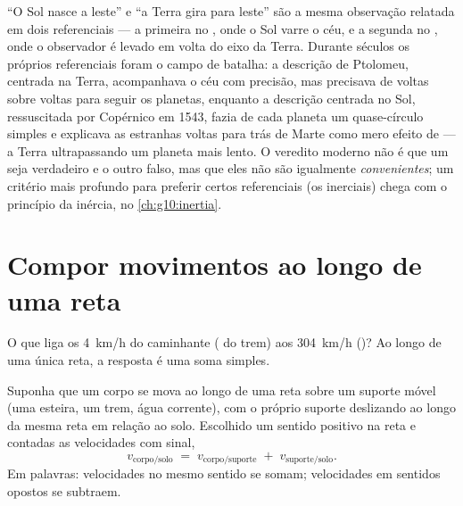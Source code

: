 \begin{remark}\label{rem:g10:relative-motion:history}
``O Sol nasce a leste'' e ``a Terra gira para leste'' são a mesma
observação relatada em dois referenciais --- a primeira no , onde o Sol varre o céu, e a segunda no ,
onde o observador é levado em volta do eixo da Terra. Durante séculos os
próprios referenciais foram o campo de batalha: a descrição de Ptolomeu,
centrada na Terra, acompanhava o céu com precisão, mas precisava de
voltas sobre voltas para seguir os planetas, enquanto a descrição
centrada no Sol, ressuscitada por Copérnico em 1543, fazia de cada
planeta um quase-círculo simples e explicava as estranhas voltas para
trás de Marte como mero efeito de  --- a Terra ultrapassando
um planeta mais lento. O veredito moderno não é que um  seja
verdadeiro e o outro falso, mas que eles não são igualmente
\emph{convenientes}; um critério mais profundo para preferir certos
referenciais (os inerciais) chega com o princípio da inércia, no
\cref{ch:g10:inertia}.
\end{remark}

\section{Compor movimentos ao longo de uma reta}

O que liga os \qty{4}{km/h} do caminhante ( do trem) aos
\qty{304}{km/h} ()? Ao longo de uma única reta, a
resposta é uma soma simples.

\begin{proposition}\label{prop:g10:relative-motion:compose}
Suponha que um corpo se mova ao longo de uma reta sobre um suporte móvel
(uma esteira, um trem, água corrente), com o próprio suporte deslizando
ao longo da mesma reta em relação ao solo. Escolhido um sentido positivo
na reta e contadas as velocidades com sinal,
\[
v_{\text{corpo/solo}} \;=\; v_{\text{corpo/suporte}} \;+\;
v_{\text{suporte/solo}} .
\]
Em palavras: velocidades no mesmo sentido se somam; velocidades em
sentidos opostos se subtraem.
\end{proposition}

